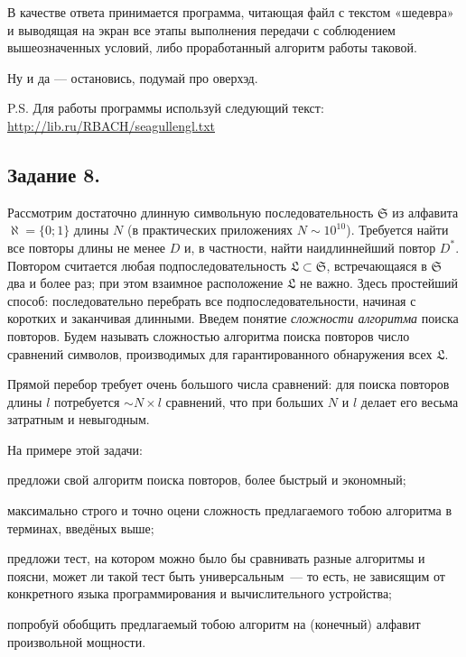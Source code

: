     
    В качестве ответа принимается программа, читающая файл с текстом «шедевра» и выводящая на экран все этапы выполнения передачи с соблюдением вышеозначенных условий, либо проработанный алгоритм работы таковой.
    
    
    Ну и да — остановись, подумай про оверхэд. 
    
    
    P.S. Для работы программы используй следующий текст:\\ \url{http://lib.ru/RBACH/seagullengl.txt}

\subsection*{Задание 8.}
Рассмотрим достаточно длинную символьную последовательность $\mathfrak{S}$ из алфавита  $\aleph  =
\{0; 1\}$ длины $N$ (в практических приложениях $N \sim  10^{10}$). Требуется найти все повторы длины не менее $D$ и, в частности, найти наидлиннейший повтор $D^{\ast}$. Повтором считается любая подпоследовательность $\mathfrak{L}\subset \mathfrak{S}$, встречающаяся в $\mathfrak{S}$ два и более раз; при этом взаимное расположение $\mathfrak{L}$ не важно. Здесь простейший способ: последовательно перебрать все подпоследовательности, начиная с коротких и заканчивая длинными. Введем понятие \textsl{сложности алгоритма} поиска повторов. Будем называть сложностью алгоритма поиска повторов число сравнений символов, производимых для гарантированного обнаружения всех $\mathfrak{L}$.

Прямой перебор требует очень большого числа сравнений: для поиска повторов длины $l$ потребуется $\sim  N \times  l$ сравнений, что при больших $N$ и $l$ делает его весьма затратным и невыгодным.

На примере этой задачи:
\begin{list}{)}{\leftmargin=6mm  \topsep=0mm  \itemsep=0pt \parsep=0mm \itemindent=-1pt}
\item предложи свой алгоритм поиска повторов, более быстрый и экономный;
\item максимально строго и точно оцени сложность предлагаемого тобою алгоритма в терминах, введёных выше;
\item предложи тест, на котором можно было бы сравнивать разные алгоритмы и поясни, может ли такой тест быть универсальным~— то есть, не зависящим от конкретного языка программирования и
вычислительного устройства;
\item попробуй обобщить предлагаемый тобою алгоритм на (конечный) алфавит произвольной мощности.
\end{list}

